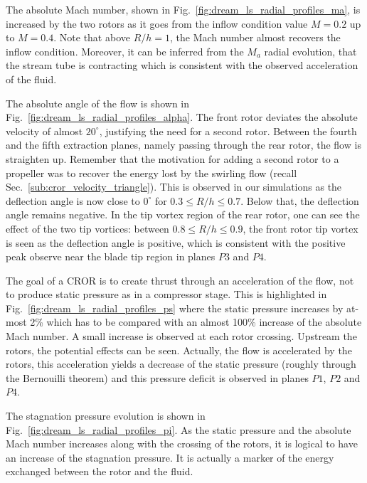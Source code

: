 The absolute Mach number, shown in 
Fig.~\ref{fig:dream_ls_radial_profiles_ma}, is increased by
the two rotors as it goes from the inflow condition value $M=0.2$
up to $M=0.4$. Note that above $R/h=1$, the Mach number
almost recovers the inflow condition. Moreover, it can be inferred from the
$M_a$ radial evolution, that the stream tube is contracting which is consistent
with the observed acceleration of the fluid.

The absolute angle of the flow is shown in 
Fig.~\ref{fig:dream_ls_radial_profiles_alpha}. The front rotor
deviates the absolute velocity of almost $20^\circ$, justifying the need
for a second rotor. Between the fourth and the fifth extraction planes, namely
passing through the rear rotor, the flow is straighten up. Remember that 
the motivation for adding a second rotor to a propeller
was to recover the energy lost by the swirling flow
(recall Sec.~\ref{sub:cror_velocity_triangle}). This is observed in our simulations as
the deflection angle is now close to $0^\circ$ for $0.3 \leq R/h \leq 0.7$.
Below that, the deflection angle remains negative. In the tip vortex region
of the rear rotor, one can see the effect of the two tip vortices: between 
$0.8 \leq R/h \leq 0.9$, the front rotor tip vortex is seen as the 
deflection angle is positive, which is consistent with the positive
peak observe near the blade tip region in planes $P3$ and $P4$.

The goal of a CROR is to create thrust through an acceleration of 
the flow, not to produce static pressure as in a compressor stage.
This is highlighted in Fig.~\ref{fig:dream_ls_radial_profiles_ps}
where the static pressure increases by at-most 2\% which has to 
be compared with an almost 100\% increase of the absolute
Mach number. 
A small increase is observed at each
rotor crossing. Upstream the rotors, the potential effects can
be seen. Actually, the flow is accelerated by the rotors, this acceleration
yields a decrease of the static pressure 
(roughly through the Bernouilli theorem) and this pressure deficit is observed in
planes $P1$, $P2$ and $P4$.

The stagnation pressure evolution is shown in 
Fig.~\ref{fig:dream_ls_radial_profiles_pi}. As the static pressure
and the absolute Mach number increases along with the crossing of the rotors,
it is logical to have an increase of the stagnation pressure.
It is actually a marker of the energy exchanged between the rotor
and the fluid.

